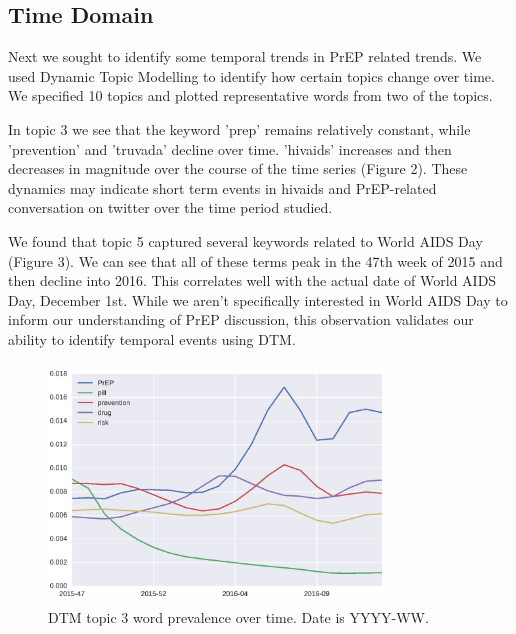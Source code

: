 \documentclass{sig-alternate-05-2015}
\begin{document}

\subsection{Time Domain}


Next we sought to identify some temporal trends in PrEP related trends. We used Dynamic Topic Modelling to identify how certain topics change over time. We specified 10 topics and plotted representative words from two of the topics.

In topic 3 we see that the keyword 'prep' remains relatively constant, while 'prevention' and 'truvada' decline over time. 'hivaids' increases and then decreases in magnitude over the course of the time series (Figure 2). These dynamics may indicate short term events in hivaids and PrEP-related conversation on twitter over the time period studied.

We found that topic 5 captured several keywords related to World AIDS Day (Figure 3). We can see that all of these terms peak in the 47th week of 2015 and then decline into 2016. This correlates well with the actual date of World AIDS Day, December 1st. While we aren't specifically interested in World AIDS Day to inform our understanding of PrEP discussion, this observation validates our ability to identify temporal events using DTM.

\begin{figure}
\centering
\includegraphics[height=2.5in, width=3.5in]{DTMfig1}
\caption{DTM topic 3 word prevalence over time. Date is YYYY-WW.}
\end{figure}
\end{document}

